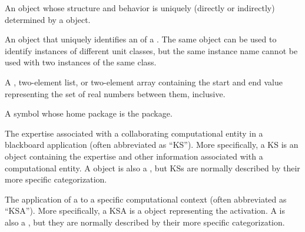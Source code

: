 \begin{glossary-list}
\glent[instance]
%
%
%
An object whose structure and behavior is uniquely (directly or indirectly)
determined by a  object.


%
%
%
%
An object that uniquely identifies an  of a
.  The same object can be used to identify instances of
different unit classes, but the same instance name cannot be used with two
instances of the same class.


\glent[interval] 
%
%
A , two-element list, or two-element array containing the start
and end value representing the set of real numbers between them, inclusive.


%
%
%
%
%
A symbol whose home package is the  package.


%
%
%
%
%
The expertise associated with a collaborating computational entity in
a blackboard application (often abbreviated as ``KS''). More
specifically, a KS is an object containing the expertise and other
information associated with a computational entity. A  object
is also a , but KSs are normally described
by their more specific categorization.


\glent[KS~activation]
%
%
%
%
%
%
%
%
%
The application of a  to a specific computational context
(often abbreviated as ``KSA'').  More specifically, a KSA is a
 object representing the  activation.  A
 is also a , but they are normally
described by their more specific categorization.


\end{glossary-list}
